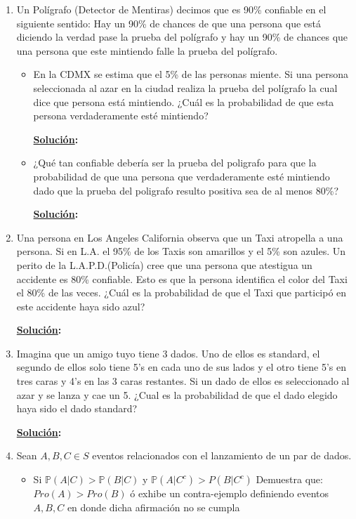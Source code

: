 \documentclass[11pt,letterpaper]{report}
\newcommand{\Pro}{\mathds{P}}
\newcommand{\sol}{\textbf{\underline{Solución}: }} %
\begin{document}
\begin{enumerate}
\item  Un Polígrafo (Detector de Mentiras) decimos que es 90\% confiable en el siguiente sentido: Hay
un 90\% de chances de que una persona que está diciendo la verdad pase la prueba del polígrafo y
hay un 90\% de chances que una persona que este mintiendo falle la prueba del polígrafo.
\begin{itemize}
    \item En la CDMX se estima que el 5\% de las personas miente. Si una persona seleccionada al
    azar en la ciudad realiza la prueba del polígrafo la cual dice que persona está mintiendo.
    ¿Cuál es la probabilidad de que esta persona verdaderamente esté mintiendo?
    
    \sol 

    \item ¿Qué tan confiable debería ser la prueba del poligrafo para que la probabilidad de que una
    persona que verdaderamente esté mintiendo dado que la prueba del poligrafo resulto positiva sea
    de al menos 80\%?
    
    \sol
\end{itemize}

\item Una persona en Los Angeles California observa que un Taxi atropella a una persona. Si en L.A.
el 95\% de los Taxis son amarillos y el 5\% son azules. Un perito de la L.A.P.D.(Policía) cree que
una persona que atestigua un accidente es 80\% confiable. Esto es que la persona identifica el color
del Taxi el 80\% de las veces. ¿Cuál es la probabilidad de que el Taxi que participó en este
accidente haya sido azul?

\sol

\item Imagina que un amigo tuyo tiene 3 dados. Uno de ellos es standard, el segundo de ellos solo
tiene 5's en cada uno de sus lados y el otro tiene 5's en tres caras y 4's en las 3 caras restantes.
Si un dado de ellos es seleccionado al azar y se lanza y cae un 5. ¿Cual es la probabilidad de que
el dado elegido haya sido el dado standard?

\sol

\item Sean $A, B, C \in S$ eventos relacionados con el lanzamiento de un par de dados.
\begin{itemize}
    \item Si $\Pro(A|C) > \Pro(B|C)$ y $\Pro(A|C^c)>P(B|C^c)$
    Demuestra que: $Pro(A)>Pro(B)$ ó exhibe un contra-ejemplo definiendo eventos $A, B, C$ en donde
    dicha afirmación no se cumpla
    

\end{itemize}
\end{enumerate}
\end{document}
